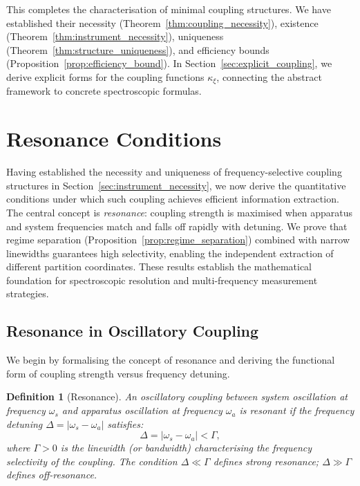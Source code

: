 \documentclass[twocolumn,10pt,a4paper]{article}
\newtheorem{definition}[theorem]{Definition}
\theoremstyle{remark}
\begin{document}
This completes the characterisation of minimal coupling structures. We have established their necessity (Theorem~\ref{thm:coupling_necessity}), existence (Theorem~\ref{thm:instrument_necessity}), uniqueness (Theorem~\ref{thm:structure_uniqueness}), and efficiency bounds (Proposition~\ref{prop:efficiency_bound}). In Section~\ref{sec:explicit_coupling}, we derive explicit forms for the coupling functions $\kappa_\xi$, connecting the abstract framework to concrete spectroscopic formulas.

\section{Resonance Conditions}
\label{sec:resonance}

Having established the necessity and uniqueness of frequency-selective coupling structures in Section~\ref{sec:instrument_necessity}, we now derive the quantitative conditions under which such coupling achieves efficient information extraction. The central concept is \emph{resonance}: coupling strength is maximised when apparatus and system frequencies match and falls off rapidly with detuning. We prove that regime separation (Proposition~\ref{prop:regime_separation}) combined with narrow linewidths guarantees high selectivity, enabling the independent extraction of different partition coordinates. These results establish the mathematical foundation for spectroscopic resolution and multi-frequency measurement strategies.

\subsection{Resonance in Oscillatory Coupling}

We begin by formalising the concept of resonance and deriving the functional form of coupling strength versus frequency detuning.

\begin{definition}[Resonance]
\label{def:resonance}
An oscillatory coupling between system oscillation at frequency $\omega_s$ and apparatus oscillation at frequency $\omega_a$ is \emph{resonant} if the frequency detuning $\Delta = |\omega_s - \omega_a|$ satisfies:
\begin{equation}
\Delta = |\omega_s - \omega_a| < \Gamma,
\end{equation}
where $\Gamma > 0$ is the \emph{linewidth} (or \emph{bandwidth}) characterising the frequency selectivity of the coupling. The condition $\Delta \ll \Gamma$ defines \emph{strong resonance}; $\Delta \gg \Gamma$ defines \emph{off-resonance}.
\end{definition}
\end{document}
